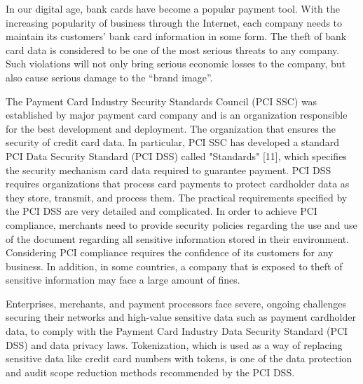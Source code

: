 \documentclass[journal]{IEEEtran}
\begin{document}

In our digital age, bank cards have become a popular payment tool. With the increasing popularity of business through the Internet, each company needs to maintain its customers' bank card information in some form. The theft of bank card data is considered to be one of the most serious threats to any company. Such violations will not only bring serious economic losses to the company, but also cause serious damage to the “brand image”.

The Payment Card Industry Security Standards Council (PCI SSC) was established by major payment card company and is an organization responsible for the best development and deployment. The organization that ensures the security of credit card data. In particular, PCI SSC has developed a standard PCI Data Security Standard (PCI DSS) called "Standards" [11], which specifies the security mechanism card data required to guarantee payment. PCI DSS requires organizations that process card payments to protect cardholder data as they store, transmit, and process them. The practical requirements specified by the PCI DSS are very detailed and complicated. In order to achieve PCI compliance, merchants need to provide security policies regarding the use and use of the document regarding all sensitive information stored in their environment. Considering PCI compliance requires the confidence of its customers for any business. In addition, in some countries, a company that is exposed to theft of sensitive information may face a large amount of fines.

Enterprises, merchants, and payment processors face severe, ongoing challenges securing their networks and high-value sensitive data such as payment cardholder data, to comply with the Payment Card Industry Data Security Standard (PCI DSS) and data privacy laws. Tokenization, which is used as a way of replacing sensitive data like credit card numbers with tokens, is one of the data protection and audit scope reduction methods recommended by the PCI DSS. 
\end{document}
